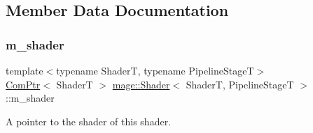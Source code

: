 \subsection{Member Data Documentation}
\hypertarget{classmage_1_1_shader_ac63260bdb25648451ddc1ee09d67c061}{}\label{classmage_1_1_shader_ac63260bdb25648451ddc1ee09d67c061} 
\subsubsection{\texorpdfstring{m\+\_\+shader}{m\_shader}}
{\footnotesize\ttfamily template$<$typename ShaderT, typename Pipeline\+StageT$>$ \\
\hyperlink{namespacemage_ae74f374780900893caa5555d1031fd79}{Com\+Ptr}$<$ ShaderT $>$ \hyperlink{classmage_1_1_shader}{mage\+::\+Shader}$<$ ShaderT, Pipeline\+StageT $>$\+::m\+\_\+shader\hspace{0.3cm}{\ttfamily [private]}}

A pointer to the shader of this shader. 